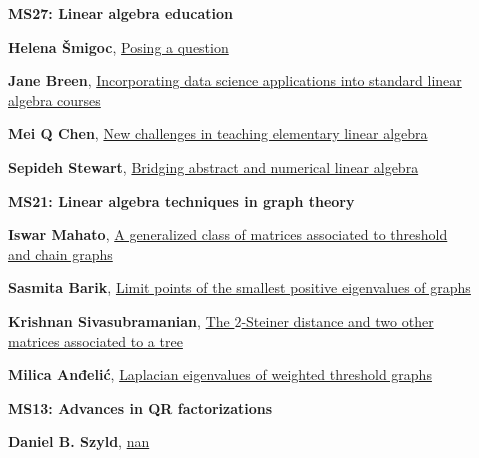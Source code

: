\documentclass[ILAS2025-program.tex]{subfiles}
\begin{document}
\begin{description}
\begin{description}
        \end{description}
    \begin{description}
    \item[] {\color{mstitle}\textbf{MS27: Linear algebra education}} 
    \item[] \hypertarget{up0331}{}\textbf{Helena Šmigoc}, \hyperlink{down0331}{Posing a question}
        \item[] \hypertarget{up0332}{}\textbf{Jane Breen}, \hyperlink{down0332}{Incorporating data science applications into standard linear algebra courses
}
        \item[] \hypertarget{up0333}{}\textbf{Mei Q Chen}, \hyperlink{down0333}{New challenges in teaching elementary linear algebra}
        \item[] \hypertarget{up0334}{}\textbf{Sepideh Stewart}, \hyperlink{down0334}{Bridging abstract and numerical linear algebra}
        \end{description}
    \begin{description}
    \item[] {\color{mstitle}\textbf{MS21: Linear algebra techniques in graph theory}} 
    \item[] \hypertarget{up0335}{}\textbf{Iswar Mahato}, \hyperlink{down0335}{A generalized class of matrices associated to threshold and chain graphs}
        \item[] \hypertarget{up0336}{}\textbf{Sasmita Barik}, \hyperlink{down0336}{Limit points of the smallest positive eigenvalues of graphs
}
        \item[] \hypertarget{up0337}{}\textbf{Krishnan Sivasubramanian}, \hyperlink{down0337}{The $2$-Steiner distance and two other matrices associated to a tree}
        \item[] \hypertarget{up0338}{}\textbf{Milica Anđelić}, \hyperlink{down0338}{Laplacian eigenvalues of weighted threshold graphs}
        \end{description}
    \begin{description}
    \item[] {\color{mstitle}\textbf{MS13: Advances in QR factorizations}} 
    \item[] \hypertarget{up0339}{}\textbf{Daniel B. Szyld}, \hyperlink{down0339}{nan}

\end{description}
\end{description}
\end{document}
